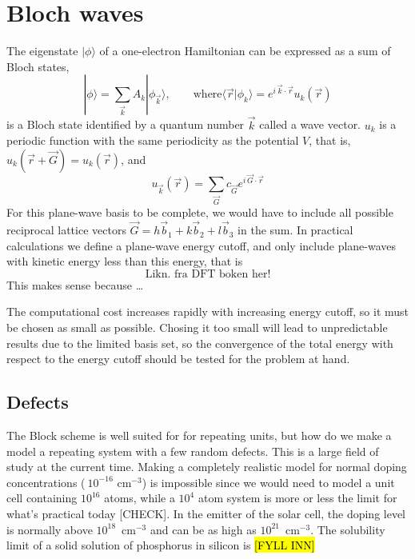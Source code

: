 \documentclass[11pt]{scrbook}   %
\newcommand{\comment}[1]{\hl{#1}}
\begin{document}
\section{Bloch waves}

The eigenstate $|\phi\rangle$ of a one-electron Hamiltonian can be expressed 
as a sum of Bloch states,
\begin{equation}
  |\phi\rangle = \sum_{\vec{k}} A_k |\phi_{\vec{k}}\rangle,\qquad \text{where} 
  \langle\vec{r}|\phi_k\rangle = e^{i\,\vec{k}\cdot\vec{r}} u_k(\vec{r})
\end{equation}
is a Bloch state identified by a quantum number $\vec{k}$ called a wave vector.
$u_k$ is a periodic function with the same periodicity as
the potential $V$, that is, $u_k(\vec{r}+\vec{G}) = u_k(\vec{r})$, and
\begin{equation}
  u_{\vec{k}}(\vec{r}) = \sum_{\vec{G}} c_{\vec{G}} e^{i\,\vec{G}\cdot\vec{r}}
\end{equation}
For this plane-wave basis to be complete, we would have to include all possible
reciprocal lattice vectors $\vec{G} = h\vec{b}_1 + k\vec{b}_2 + l\vec{b}_3$ in
the sum. In practical calculations we define a plane-wave energy cutoff, and
only include plane-waves with kinetic energy less than this energy, that is
\begin{equation}
  \text{Likn. fra DFT boken her!}
\end{equation}
This makes sense because \ldots

The computational cost increases rapidly with increasing energy cutoff, so it
must be chosen as small as possible. Chosing it too small will lead to
unpredictable results due to the limited basis set, so the convergence of the 
total energy with respect to the energy cutoff should be tested for the 
problem at hand.

\subsection{Defects}

The Block scheme is well suited for for repeating units, but how do we make a
model a repeating system with a few random defects. This is a large field of
study at the current time.
Making a completely realistic model for normal doping 
concentrations ($~10^{-16}$ cm$^{-3}$) is impossible since we would need to 
model a unit cell containing $10^{16}$ atoms, while a $10^4$ atom system is more or
less the limit for what's practical today [CHECK]. In the emitter of the
solar cell, the doping level is normally above $10^{18}$~cm$^{-3}$ and can be
as high as $10^{21}$~cm$^{-3}$. The solubility limit of a solid solution of
phosphorus in silicon is \comment{[FYLL INN]}
\end{document}
